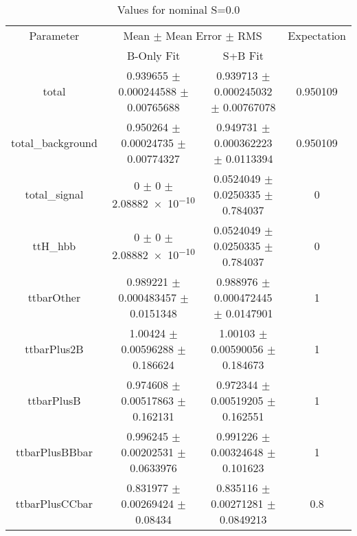 \begin{table}
\centering
\caption{Values for nominal S=0.0}
\begin{tabular}{cccc}
\toprule
Parameter & \multicolumn{2}{c}{Mean $\pm$ Mean Error $\pm$ RMS} & Expectation\\
 & B-Only Fit & S+B Fit & \\
\midrule
total & \num{0.939655} $\pm$ \num{0.000244588} $\pm$ \num{0.00765688} & \num{0.939713} $\pm$ \num{0.000245032} $\pm$ \num{0.00767078} & \num{0.950109}\\
total\_background & \num{0.950264} $\pm$ \num{0.00024735} $\pm$ \num{0.00774327} & \num{0.949731} $\pm$ \num{0.000362223} $\pm$ \num{0.0113394} & \num{0.950109}\\
total\_signal & \num{0} $\pm$ \num{0} $\pm$ \num{2.08882e-10} & \num{0.0524049} $\pm$ \num{0.0250335} $\pm$ \num{0.784037} & \num{0}\\
ttH\_hbb & \num{0} $\pm$ \num{0} $\pm$ \num{2.08882e-10} & \num{0.0524049} $\pm$ \num{0.0250335} $\pm$ \num{0.784037} & \num{0}\\
ttbarOther & \num{0.989221} $\pm$ \num{0.000483457} $\pm$ \num{0.0151348} & \num{0.988976} $\pm$ \num{0.000472445} $\pm$ \num{0.0147901} & \num{1}\\
ttbarPlus2B & \num{1.00424} $\pm$ \num{0.00596288} $\pm$ \num{0.186624} & \num{1.00103} $\pm$ \num{0.00590056} $\pm$ \num{0.184673} & \num{1}\\
ttbarPlusB & \num{0.974608} $\pm$ \num{0.00517863} $\pm$ \num{0.162131} & \num{0.972344} $\pm$ \num{0.00519205} $\pm$ \num{0.162551} & \num{1}\\
ttbarPlusBBbar & \num{0.996245} $\pm$ \num{0.00202531} $\pm$ \num{0.0633976} & \num{0.991226} $\pm$ \num{0.00324648} $\pm$ \num{0.101623} & \num{1}\\
ttbarPlusCCbar & \num{0.831977} $\pm$ \num{0.00269424} $\pm$ \num{0.08434} & \num{0.835116} $\pm$ \num{0.00271281} $\pm$ \num{0.0849213} & \num{0.8}\\
\bottomrule
\end{tabular}
\end{table}